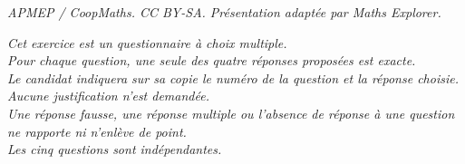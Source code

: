 \documentclass[10pt]{article}
\begin{document}
\noindent\textit{APMEP / CoopMaths. CC BY-SA. Présentation adaptée par Maths Explorer.}\par\medskip
\medskip

\emph{Cet exercice est un questionnaire à choix multiple. \\Pour chaque question, une seule des quatre réponses proposées est exacte.\\Le candidat indiquera sur sa copie le numéro de la question et la réponse choisie.\\Aucune justification n'est demandée.\\
Une réponse fausse, une réponse multiple ou l'absence de réponse à une question ne rapporte ni n'enlève de point.\\Les cinq questions sont indépendantes.}

\medskip
\end{document}
